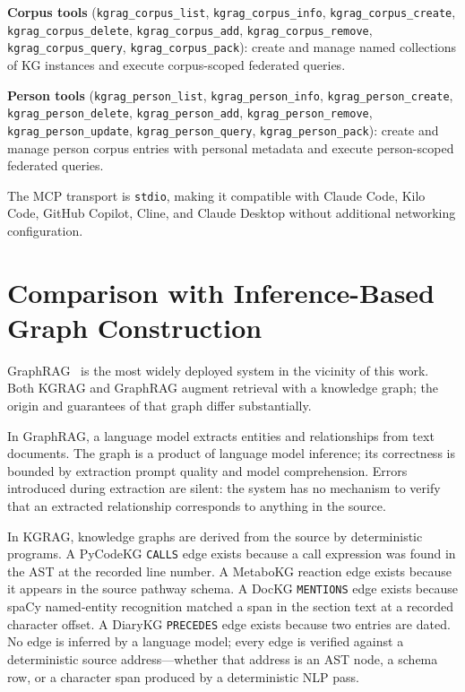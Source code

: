 \documentclass[10pt]{article}
\begin{document}
\begin{sloppypar}
\textbf{Corpus tools} (\texttt{kgrag\_corpus\_list}, \texttt{kgrag\_corpus\_info},
\texttt{kgrag\_corpus\_create}, \texttt{kgrag\_corpus\_delete},
\texttt{kgrag\_corpus\_add}, \texttt{kgrag\_corpus\_remove},
\texttt{kgrag\_corpus\_query}, \texttt{kgrag\_corpus\_pack}): create and manage
named collections of KG instances and execute corpus-scoped federated queries.
\end{sloppypar}

\begin{sloppypar}
\textbf{Person tools} (\texttt{kgrag\_person\_list}, \texttt{kgrag\_person\_info},
\texttt{kgrag\_person\_create}, \texttt{kgrag\_person\_delete},
\texttt{kgrag\_person\_add}, \texttt{kgrag\_person\_remove},
\texttt{kgrag\_person\_update}, \texttt{kgrag\_person\_query},
\texttt{kgrag\_person\_pack}): create and manage person corpus entries with
personal metadata and execute person-scoped federated queries.
\end{sloppypar}

The MCP transport is \texttt{stdio}, making it compatible with Claude Code,
Kilo Code, GitHub Copilot, Cline, and Claude Desktop without additional
networking configuration.

\section{Comparison with Inference-Based Graph Construction}

GraphRAG~\cite{edge2024graphrag} is the most widely deployed system in the
vicinity of this work. Both KGRAG and GraphRAG augment retrieval with a
knowledge graph; the origin and guarantees of that graph differ substantially.

In GraphRAG, a language model extracts entities and relationships from text
documents. The graph is a product of language model inference; its correctness
is bounded by extraction prompt quality and model comprehension. Errors
introduced during extraction are silent: the system has no mechanism to verify
that an extracted relationship corresponds to anything in the source.

In KGRAG, knowledge graphs are derived from the source by deterministic
programs. A PyCodeKG \texttt{CALLS} edge exists because a call expression was
found in the AST at the recorded line number. A MetaboKG reaction edge exists
because it appears in the source pathway schema. A DocKG \texttt{MENTIONS}
edge exists because spaCy named-entity recognition matched a span in the
section text at a recorded character offset. A DiaryKG \texttt{PRECEDES} edge
exists because two entries are dated. No edge is inferred by a language model;
every edge is verified against a deterministic source address---whether that
address is an AST node, a schema row, or a character span produced by a
deterministic NLP pass.
\end{document}
